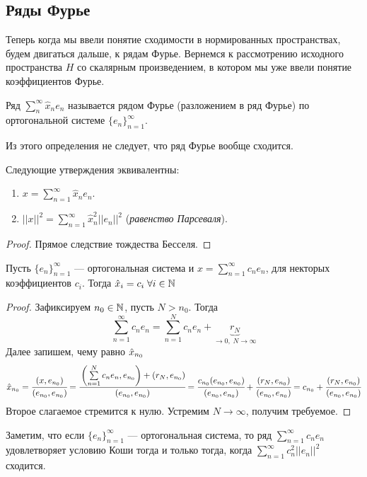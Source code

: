 \documentclass[a4paper, 12pt]{article}
\begin{document}
\subsection{Ряды Фурье}
Теперь когда мы ввели понятие сходимости в нормированных пространствах, будем двигаться дальше, к рядам Фурье. Вернемся к рассмотрению исходного пространства $H$ со скалярным произведением, в котором мы уже ввели понятие коэффициентов Фурье.
\begin{Def}
    Ряд $\sum\limits_{n}^{\infty} \hat{x}_ne_n$ называется рядом Фурье (разложением в ряд Фурье) по ортогональной системе $\{e_n\}_{n=1}^{\infty}$.
\end{Def}
Из этого определения не следует, что ряд Фурье вообще сходится.
\begin{Statement}
    Следующие утверждения эквивалентны:
    \begin{enumerate}
        \item $x = \sum\limits_{n=1}^{\infty} \hat{x}_ne_n$.
        \item $||x||^2 = \sum\limits_{n=1}^{\infty} \hat{x}^2_n ||e_n||^2$ (\textit{равенство Парсеваля}).
    \end{enumerate}
\end{Statement}
\begin{proof}
    Прямое следствие тождества Бесселя.
\end{proof}
\begin{Statement}
    Пусть $\{e_n\}_{n=1}^{\infty}$ --- ортогональная система и $x = \sum\limits_{n=1}^{\infty}c_n e_n$, для некторых коэффициентов $c_i$. Тогда $\hat{x}_i = c_i\; \forall i \in \mathbb{N}$
\end{Statement}
\begin{proof}
    Зафиксируем $n_0\in \mathbb{N}$, пусть $N>n_0$. Тогда
    $$
        \sum\limits_{n=1}^{\infty} c_ne_n = \sum \limits_{n=1}^{N}c_n e_n + \underbrace{r_N}_{\to 0,\; N\to \infty}
    $$
    Далее запишем, чему равно $\hat{x}_{n_0}$
    $$
        \hat{x}_{n_0} = \cfrac{(x,e_{n_0})}{(e_{n_0}, e_{n_0})} = \cfrac{\left(\sum\limits_{n=1}^{N} c_ne_n, e_{n_0}\right) + \left(r_N, e_{n_0}\right)}{(e_{n_0}, e_{n_0})} = \cfrac{c_{n_0}(e_{n_0}, e_{n_0})}{(e_{n_0}, e_{n_0})} + \cfrac{(r_N, e_{n_0})}{(e_{n_0}, e_{n_0})} = c_{n_0} + \cfrac{(r_N, e_{n_0})}{(e_{n_0}, e_{n_0})}
    $$
    Второе слагаемое стремится к нулю. Устремим $N \to \infty$, получим требуемое.
\end{proof}
Заметим, что если $\{e_n\}_{n=1}^{\infty}$ --- ортогональная система, то ряд $\sum\limits_{n=1}^{\infty} c_n e_n$ удовлетворяет условию Коши тогда и только тогда, когда $\sum\limits_{n=1}^{\infty}c_n^2||e_n||^2$ сходится.
\end{document}
